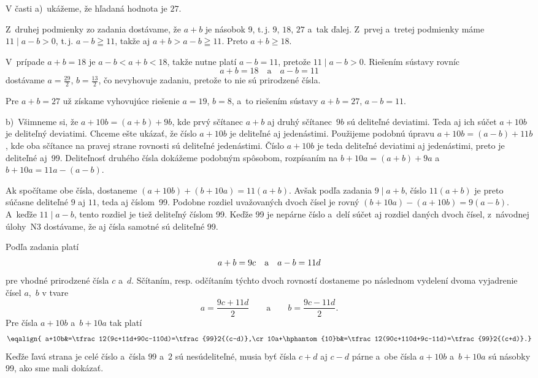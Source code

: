 {%
V časti a)~ukážeme, že hľadaná hodnota je $27$.

Z~druhej podmienky zo zadania dostávame, že $a+b$ je násobok 9, t.\,j.
$9$, $18$, $27$ a~tak ďalej.
Z~prvej a~tretej podmienky máme $11\mid a-b>0$,
 t.\,j. $a-b\geqq 11$, takže aj $a+b>a-b\geqq 11$.
Preto $a+b \geq 18$.

V~prípade $a+b=18$ je $a-b<a+b<18$, takže nutne platí $a-b=11$, pretože $11\mid a-b>0$.
Riešením sústavy rovníc
$$
a+b=18\quad\text{a}\quad a-b=11
$$
dostávame $a=\frac{29}{2}$, $b = \frac{13}{2}$, čo nevyhovuje zadaniu, pretože to nie sú prirodzené čísla.

Pre $a+b=27$ už získame vyhovujúce riešenie $a=19$, $b=8$, a~to riešením sústavy $a+b=27$, $a-b=11$.

\medskip
b)~Všimneme si, že $a+10b=(a+b)+9b$, kde prvý sčítanec $a+b$ aj druhý sčítanec~$9b$ sú deliteľné deviatimi. Teda aj ich súčet $a+10b$ je deliteľný deviatimi. Chceme ešte ukázať, že číslo $a+10b$ je deliteľné aj jedenástimi. Použijeme podobnú úpravu $a+10b=(a-b)+11b$, kde oba sčítance na pravej strane rovnosti sú deliteľné jedenástimi. Číslo $a+10b$ je teda deliteľné deviatimi aj jedenástimi, preto je deliteľné aj~99. Deliteľnosť druhého čísla dokážeme podobným spôsobom, rozpísaním na $b+10a=(a+b)+9a$ a~$b+10a=11a-(a-b)$.

Ak spočítame obe čísla, dostaneme $(a+10b) + (b+10a) = 11(a+b)$. Avšak podľa zadania $9\mid a+b$, číslo $11(a+b)$ je preto súčasne deliteľné $9$ aj $11$, teda aj číslom~99. Podobne rozdiel uvažovaných dvoch čísel je rovný $(b+10a)-(a+10b)=9(a-b)$. A~keďže $11\mid a-b$, tento rozdiel je tiež deliteľný číslom 99. Keďže 99 je nepárne číslo a~delí súčet aj rozdiel daných dvoch čísel, z~návodnej úlohy~N3 dostávame, že aj čísla samotné sú deliteľné 99.

Podľa zadania platí
$$
a+b=9c\quad{\hbox{a}}\quad a-b=11d
$$
pre vhodné prirodzené čísla $c$ a~$d$. Sčítaním, resp. odčítaním
týchto dvoch rovností dostaneme
po následnom vydelení dvoma vyjadrenie čísel
$a$,~$b$ v tvare
$$
a=\frac{9c+11d}{2} \qquad\text{a}\qquad
b=\frac{9c-11d}2.
$$
Pre čísla $a+10b$ a~$b+10a$ tak platí
$$\eqalign{
a+10b&=\tfrac12(9c+11d+90c-110d)=\tfrac{99}2{(c-d)},\cr
10a+\hphantom{10}b&=\tfrac12(90c+110d+9c-11d)=\tfrac{99}2{(c+d)}.}$$
Keďže ľavá strana je celé číslo a~čísla $99$ a~$2$ sú nesúdeliteľné, musia byť čísla $c+d$ aj $c-d$ párne a~obe čísla $a+10b$ a~$b+10a$ sú násobky 99,
ako sme mali dokázať.

}
